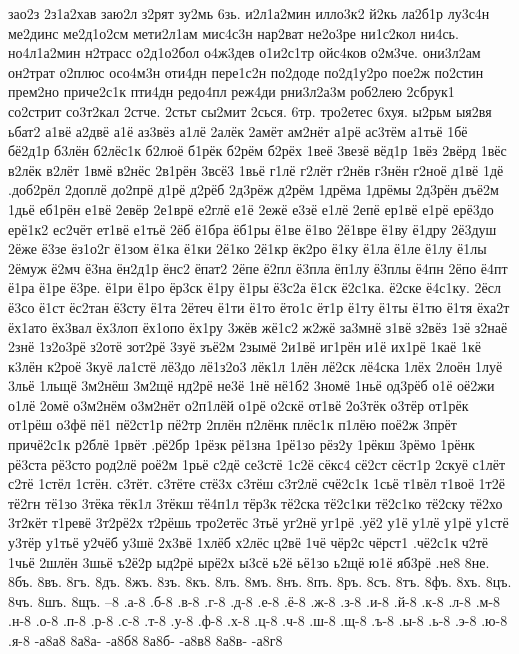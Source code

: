 {зао2з
2з1а2хав
заю2л
з2рят
зу2мь
6зь.
и2л1а2мин
илло3к2
й2кь
ла2б1р
лу3с4н
ме2динс
ме2д1о2см
мети2л1ам
мис4с3н
нар2ват
не2о3ре
ни1с2кол
ни4сь.
но4л1а2мин
н2трасс
о2д1о2бол
о4ж3дев
о1и2с1тр
ойс4ков
о2м3че.
они3л2ам
он2трат
о2плюс
осо4м3н
оти4дн
пере1с2н
по2доде
по2д1у2ро
пое2ж
по2стин
прем2но
приче2с1к
пти4дн
редо4пл
реж4ди
рни3л2а3м
роб2лею
2сбрук1
со2стрит
со3т2кал
2стче.
2стьт
сы2мит
2сься.
6тр.
тро2етес
6хуя.
ы2рьм
ыя2вя
ьбат2
а1вё
а2двё
а1ё
аз3вёз
а1лё
2алёк
2амёт
ам2нёт
а1рё
ас3тём
а1тьё
1бё
бё2д1р
б3лён
б2лёс1к
б2люё
б1рёк
б2рём
б2рёх
1веё
3везё
вёд1р
1вёз
2вёрд
1вёс
в2лёк
в2лёт
1вмё
в2нёс
2в1рён
3всё3
1вьё
г1лё
г2лёт
г2нёв
г3нён
г2ноё
д1вё
1дё
.доб2рёл
2доплё
до2прё
д1рё
д2рёб
2д3рёж
д2рём
1дрёма
1дрёмы
2д3рён
дъё2м
1дьё
еб1рён
е1вё
2евёр
2е1врё
е2глё
е1ё
2ежё
е3зё
е1лё
2епё
ер1вё
е1рё
ерё3до
ерё1к2
ес2чёт
ет1вё
е1тьё
2ёб
ё1бра
ёб1ры
ё1ве
ё1во
2ё1вре
ё1ву
ё1дру
2ё3душ
2ёже
ё3зе
ёз1о2г
ё1зом
ё1ка
ё1ки
2ё1ко
2ё1кр
ёк2ро
ё1ку
ё1ла
ё1ле
ё1лу
ё1лы
2ёмуж
ё2мч
ё3на
ён2д1р
ёнс2
ёпат2
2ёпе
ё2пл
ё3пла
ёп1лу
ё3плы
ё4пн
2ёпо
ё4пт
ё1ра
ё1ре
ё3ре.
ё1ри
ё1ро
ёр3ск
ё1ру
ё1ры
ё3с2а
ё1ск
ё2с1ка.
ё2ске
ё4с1ку.
2ёсл
ё3со
ё1ст
ёс2тан
ё3сту
ё1та
2ётеч
ё1ти
ё1то
ёто1с
ёт1р
ё1ту
ё1ты
ё1тю
ё1тя
ёха2т
ёх1ато
ёх3вал
ёх3лоп
ёх1опо
ёх1ру
3жёв
жё1с2
ж2жё
за3мнё
з1вё
з2вёз
1зё
з2наё
2знё
1з2о3рё
з2отё
зот2рё
3зуё
зъё2м
2зымё
2и1вё
иг1рён
и1ё
их1рё
1каё
1кё
к3лён
к2роё
3куё
ла1стё
лё3до
лё1з2о3
лёк1л
1лён
лё2ск
лё4ска
1лёх
2лоён
1луё
3льё
1льщё
3м2нёш
3м2щё
нд2рё
не3ё
1нё
нё1б2
3номё
1ньё
од3рёб
о1ё
оё2жи
о1лё
2омё
о3м2нём
о3м2нёт
о2п1лёй
о1рё
о2скё
от1вё
2о3тёк
о3тёр
от1рёк
от1рёш
о3фё
пё1
пё2ст1р
пё2тр
2плён
п2лёнк
плёс1к
п1лёю
поё2ж
3прёт
причё2с1к
р2блё
1рвёт
.рё2бр
1рёзк
рё1зна
1рё1зо
рёз2у
1рёкш
3рёмо
1рёнк
рё3ста
рё3сто
род2лё
роё2м
1рьё
с2дё
се3стё
1с2ё
сёкс4
сё2ст
сёст1р
2скуё
с1лёт
с2тё
1стёл
1стён.
с3тёт.
с3тёте
стё3х
с3тёш
с3т2лё
счё2с1к
1сьё
т1вёл
т1воё
1т2ё
тё2гн
тё1зо
3тёка
тёк1л
3тёкш
тё4п1л
тёр3к
тё2ска
тё2с1ки
тё2с1ко
тё2ску
тё2хо
3т2кёт
т1ревё
3т2рё2х
т2рёшь
тро2етёс
3тьё
уг2нё
уг1рё
.уё2
у1ё
у1лё
у1рё
у1стё
у3тёр
у1тьё
у2чёб
у3шё
2х3вё
1хлёб
х2лёс
ц2вё
1чё
чёр2с
чёрст1
.чё2с1к
ч2тё
1чьё
2шлён
3шьё
ъ2ё2р
ыд2рё
ырё2х
ы3сё
ь2ё
ьё1зо
ь2щё
ю1ё
яб3рё
.не8
8не.
8бъ.
8въ.
8гъ.
8дъ.
8жъ.
8зъ.
8къ.
8лъ.
8мъ.
8нъ.
8пъ.
8ръ.
8съ.
8тъ.
8фъ.
8хъ.
8цъ.
8чъ.
8шъ.
8щъ.
--8
.а-8
.б-8
.в-8
.г-8
.д-8
.е-8
.ё-8
.ж-8
.з-8
.и-8
.й-8
.к-8
.л-8
.м-8
.н-8
.о-8
.п-8
.р-8
.с-8
.т-8
.у-8
.ф-8
.х-8
.ц-8
.ч-8
.ш-8
.щ-8
.ъ-8
.ы-8
.ь-8
.э-8
.ю-8
.я-8
-а8а8
8а8а-
-а8б8
8а8б-
-а8в8
8а8в-
-а8г8
}
